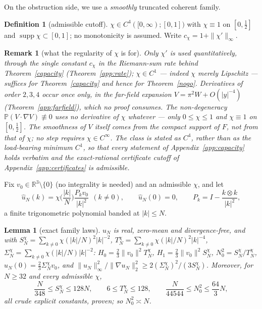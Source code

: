 \documentclass[11pt]{article}
\newtheorem{lemma}{Lemma}
\newtheorem{remark}{Remark}
\theoremstyle{definition}
\newtheorem{definition}{Definition}
\newcommand{\R}{\mathbb R}
\newcommand{\PP}{\mathbb P}
\begin{document}
On the obstruction side, we use a \emph{smoothly} truncated coherent
family.

\begin{definition}[admissible cutoff]\label{admissible}
$\chi\in C^4([0,\infty);[0,1])$ with $\chi\equiv1$ on
$[0,\tfrac12]$ and $\operatorname{supp}\chi\subset[0,1]$; no
monotonicity is assumed. Write $c_\chi=1+\|\chi'\|_\infty$.
\end{definition}

\begin{remark}[what the regularity of $\chi$ is for]\label{cutoffreg}
Only $\chi'$ is used quantitatively, through the single constant
$c_\chi$ in the Riemann-sum rate behind Theorem~\ref{capacity}
(Theorem~\ref{app:rate}); $\chi\in C^1$ --- indeed $\chi$ merely
Lipschitz --- suffices for Theorem~\ref{capacity} and hence for
Theorem~\ref{nogo}. Derivatives of order $2,3,4$ occur once only, in
the far-field expansion $V=\pi^2W+O(|y|^{-4})$
(Theorem~\ref{app:farfield}), which no proof consumes. The
non-degeneracy $\PP(V\cdot\nabla V)\not\equiv0$ uses no derivative of
$\chi$ whatever --- only $0\le\chi\le1$ and $\chi\equiv1$ on
$[0,\tfrac12]$. The smoothness of $V$ itself comes from the compact
support of $F$, not from that of $\chi$; no step requires
$\chi\in C^\infty$. The class is stated as $C^4$, rather than as the
load-bearing minimum $C^1$, so that every statement of
Appendix~\ref{app:capacity} holds verbatim and the exact-rational
certificate cutoff of Appendix~\ref{app:certificates} is admissible.
\end{remark}

Fix $v_0\in\R^3\setminus\{0\}$ (no integrality is needed) and an
admissible $\chi$, and let
\begin{equation}\label{family}
\hat u_N(k)=\chi\!\Big(\frac{|k|}{N}\Big)\frac{P_kv_0}{|k|^2}\ \ (k\neq0),
\qquad \hat u_N(0)=0,\qquad
P_k=I-\frac{k\otimes k}{|k|^2},
\end{equation}
a finite trigonometric polynomial banded at $|k|\le N$.

\begin{lemma}[exact family laws]\label{familylaws}
$u_N$ is real, zero-mean and divergence-free, and with
$S_N^\chi=\sum_{k\neq0}\chi(|k|/N)^2|k|^{-2}$,
$T_N^\chi=\sum_{k\neq0}\chi(|k|/N)^2|k|^{-4}$,
$\Sigma_N^\chi=\sum_{k\neq0}\chi(|k|/N)|k|^{-2}$:
$H_0=\tfrac23\|v_0\|^2T_N^\chi$, $H_1=\tfrac23\|v_0\|^2S_N^\chi$,
$N_0^2=S_N^\chi/T_N^\chi$, $u_N(0)=\tfrac23\Sigma_N^\chi v_0$, and
$\|u_N\|_\infty^2/\|\nabla u_N\|_2^2\ge2(\Sigma_N^\chi)^2/(3S_N^\chi)$.
Moreover, for $N\ge32$ and every admissible $\chi$,
\[
\frac{N}{348}\le S_N^\chi\le128N,\qquad 6\le T_N^\chi\le128,\qquad
\frac{N}{44544}\le N_0^2\le\frac{64}{3}N ,
\]
all crude explicit constants, proven; so $N_0^2\asymp N$.
\end{lemma}
\end{document}
